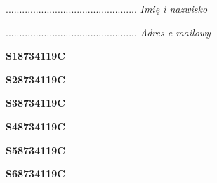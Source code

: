 \begin{turn}{90}\begin{minipage}{\linewidth} \vspace{20mm} ................................................  \textit{Imię i nazwisko}\end{minipage}\end{turn}

\begin{turn}{90}\begin{minipage}{\linewidth} \vspace{20mm} ................................................  \textit{Adres e-mailowy}\end{minipage}\end{turn}

\begin{turn}{90}\huge \begin{minipage}{\linewidth} \vspace{10mm}\textbf{S18734119C}\end{minipage}\end{turn}

\begin{turn}{90}\huge \begin{minipage}{\linewidth} \vspace{10mm}\textbf{S28734119C}\end{minipage}\end{turn}

\begin{turn}{90}\huge \begin{minipage}{\linewidth} \vspace{10mm}\textbf{S38734119C}\end{minipage}\end{turn}

\begin{turn}{90}\huge \begin{minipage}{\linewidth} \vspace{10mm}\textbf{S48734119C}\end{minipage}\end{turn}

\begin{turn}{90}\huge \begin{minipage}{\linewidth} \vspace{10mm}\textbf{S58734119C}\end{minipage}\end{turn}

\begin{turn}{90}\huge \begin{minipage}{\linewidth} \vspace{10mm}\textbf{S68734119C}\end{minipage}\end{turn}

